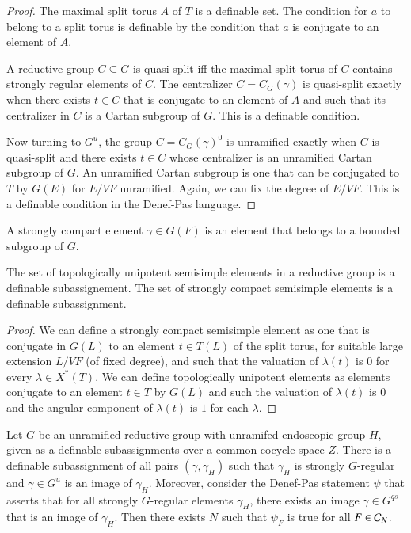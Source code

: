 \begin{proof} The maximal split torus $A$ of $T$ is a definable set.
  The condition for $a$ to belong to a split torus is definable by the
  condition that $a$ is conjugate to an element of $A$.

  A reductive group $C\subseteq G$ is quasi-split iff the maximal
  split torus of $C$ contains strongly regular elements of $C$.  The
  centralizer $C=C_G(\gamma)$ is quasi-split exactly when there exists
  $t\in C$ that is conjugate to an element of $A$ and such that its
  centralizer in $C$ is a Cartan subgroup of $G$.  This is a definable
  condition.

  Now turning to $G^u$, the group $C=C_G(\gamma)^0$ is unramified
  exactly when $C$ is quasi-split and there exists $t\in C$ whose
  centralizer is an unramified Cartan subgroup of $G$.  An unramified
  Cartan subgroup is one that can be conjugated to $T$ by $G(E)$ for
  $E/VF$ unramified.  Again, we can fix the degree of $E/VF$. This is
  a definable condition in the Denef-Pas language.
\end{proof}

A strongly compact element $\gamma\in G(F)$ is an element that
belongs to a bounded subgroup of $G$.

\begin{lemma} 
  The set of topologically unipotent semisimple elements in a
  reductive group is a definable subassignement.  The set of strongly
  compact semisimple elements is a definable subassignment.
\end{lemma}

\begin{proof} We can define a strongly compact semisimple element as
  one that is conjugate in $G(L)$ to an element $t\in T(L)$ of the
  split torus, for suitable large extension $L/VF$
  (of fixed degree), and such that the valuation of $\lambda(t)$ is
  $0$ for every $\lambda\in X^*(T)$.  We can define topologically
  unipotent elements as elements conjugate to an element $t\in T$ by
  $G(L)$ and such the valuation of $\lambda(t)$ is $0$ and the angular
  component of $\lambda(t)$ is $1$ for each $\lambda$.
\end{proof}

\begin{lemma} 
  Let $G$ be an unramified reductive group with unramifed endoscopic
  group $H$, given as a definable subassignments over a common cocycle
  space $Z$.  There is a definable subassignment of all pairs
  $(\gamma,\gamma_H)$ such that $\gamma_H$ is strongly $G$-regular and
  $\gamma\in G^u$ is an image of $\gamma_H$.  Moreover, consider the
  Denef-Pas statement $\psi$ that asserts that for all strongly
  $G$-regular elements $\gamma_H$, there exists an image
  $\gamma\in G^{qs}$ that is an image of $\gamma_H$.  Then there
  exists $N$ such that $\psi_F$ is true for all $F\in\mathcal C_N$.
\end{lemma}

